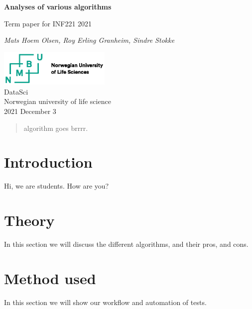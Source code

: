 \documentclass{article}
\begin{document}
\begin{titlepage}
	\begin{center}
		\vspace*{1cm}
		\Huge
		\textbf{Analyses of various algorithms}\\

		\vspace{0.5cm}
		\LARGE

		Term paper for INF221 2021\\

		\vspace{1.5cm}

		\textit{Mats Hoem Olsen, Roy Erling Granheim, Sindre Stokke}\\

		\vfill

		\includegraphics[width=0.4\textwidth]{./tex/pic/logo.eps}\\
		
		\LARGE
		DataSci\\
		Norwegian university of life science\\
		2021 December 3
	\end{center}		
\end{titlepage}

\tableofcontent
\begin{abstract}
algorithm goes brrrr.
\end{abstract}
\newpage

\section{Introduction}

Hi, we are students. How are you?

\section{Theory}

In this section we will discuss the different algorithms, and their pros, and cons.

\section{Method used}

In this section we will show our workflow and automation of tests.
\end{document}
